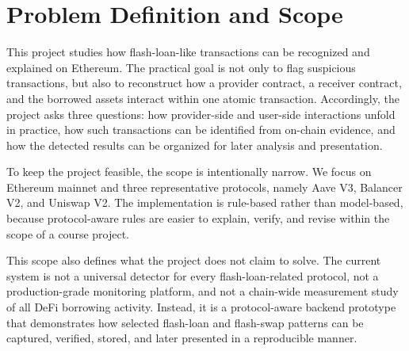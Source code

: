 \section{Problem Definition and Scope}

This project studies how flash-loan-like transactions can be recognized and explained on Ethereum. The practical goal is not only to flag suspicious transactions, but also to reconstruct how a provider contract, a receiver contract, and the borrowed assets interact within one atomic transaction. Accordingly, the project asks three questions: how provider-side and user-side interactions unfold in practice, how such transactions can be identified from on-chain evidence, and how the detected results can be organized for later analysis and presentation.

To keep the project feasible, the scope is intentionally narrow. We focus on Ethereum mainnet and three representative protocols, namely Aave V3, Balancer V2, and Uniswap V2. The implementation is rule-based rather than model-based, because protocol-aware rules are easier to explain, verify, and revise within the scope of a course project.

This scope also defines what the project does not claim to solve. The current system is not a universal detector for every flash-loan-related protocol, not a production-grade monitoring platform, and not a chain-wide measurement study of all DeFi borrowing activity. Instead, it is a protocol-aware backend prototype that demonstrates how selected flash-loan and flash-swap patterns can be captured, verified, stored, and later presented in a reproducible manner.
